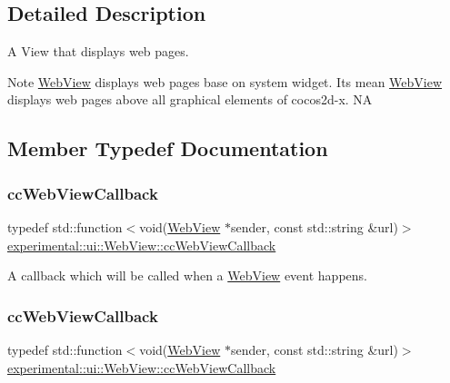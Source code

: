 \subsection{Detailed Description}
A View that displays web pages. 

\begin{DoxyNote}{Note}
\hyperlink{classexperimental_1_1ui_1_1WebView}{Web\+View} displays web pages base on system widget. It\textquotesingle{}s mean \hyperlink{classexperimental_1_1ui_1_1WebView}{Web\+View} displays web pages above all graphical elements of cocos2d-\/x.  NA 
\end{DoxyNote}


\subsection{Member Typedef Documentation}
\mbox{\label{classexperimental_1_1ui_1_1WebView_a11ddd376a5996eff614857f236b2b69d}} 
\subsubsection{\texorpdfstring{cc\+Web\+View\+Callback}{ccWebViewCallback}\hspace{0.1cm}{\footnotesize\ttfamily [1/2]}}
{\footnotesize\ttfamily typedef std\+::function$<$void(\hyperlink{classexperimental_1_1ui_1_1WebView}{Web\+View} $\ast$sender, const std\+::string \&url)$>$ \hyperlink{classexperimental_1_1ui_1_1WebView_a11ddd376a5996eff614857f236b2b69d}{experimental\+::ui\+::\+Web\+View\+::cc\+Web\+View\+Callback}}

A callback which will be called when a \hyperlink{classexperimental_1_1ui_1_1WebView}{Web\+View} event happens. \mbox{\label{classexperimental_1_1ui_1_1WebView_a11ddd376a5996eff614857f236b2b69d}} 
\subsubsection{\texorpdfstring{cc\+Web\+View\+Callback}{ccWebViewCallback}\hspace{0.1cm}{\footnotesize\ttfamily [2/2]}}
{\footnotesize\ttfamily typedef std\+::function$<$void(\hyperlink{classexperimental_1_1ui_1_1WebView}{Web\+View} $\ast$sender, const std\+::string \&url)$>$ \hyperlink{classexperimental_1_1ui_1_1WebView_a11ddd376a5996eff614857f236b2b69d}{experimental\+::ui\+::\+Web\+View\+::cc\+Web\+View\+Callback}}


